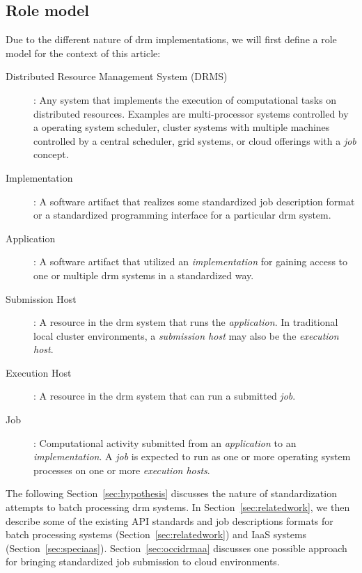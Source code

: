 \documentclass[twocolumn]{svjour3}       %
\begin{document}
\subsection{Role model}
\label{sec:rolemodel}

Due to the different nature of \gls{drm} implementations, we will first define a role model for the context of this article:

\begin{description}

\item[Distributed Resource Management System (DRMS)]: Any system that implements the execution of computational tasks on distributed resources. Examples are multi-processor systems controlled by a operating system scheduler, cluster systems with multiple machines controlled by a central scheduler, grid systems, or cloud offerings with a \emph{job} concept.

\item[Implementation]: A software artifact that realizes some standardized job description format or a standardized programming interface for a particular \gls{drm} system.

\item[Application]: A software artifact that utilized an \emph{implementation} for gaining access to one or multiple \gls{drm} systems in a standardized way.

\item[Submission Host]: A resource in the \gls{drm} system that runs the \emph{application}. In traditional local cluster environments, a \emph{submission host} may also be the \emph{execution host}.

\item[Execution Host]: A resource in the \gls{drm} system that can run a submitted \emph{job}.

\item[Job]: Computational activity submitted from an \emph{application} to an \emph{implementation}. A \emph{job} is expected to run as one or more operating system processes on one or more \emph{execution hosts}.

\end{description}


The following Section~\ref{sec:hypothesis} discusses the nature of standardization attempts to batch processing \gls{drm} systems.  In Section~\ref{sec:relatedwork}, we then describe some of the existing API standards and job descriptions formats for batch processing systems (Section~\ref{sec:relatedwork}) and IaaS systems (Section~\ref{sec:speciaas}).  Section~\ref{sec:occidrmaa} discusses one possible approach for bringing standardized job submission to cloud environments. 
\end{document}
